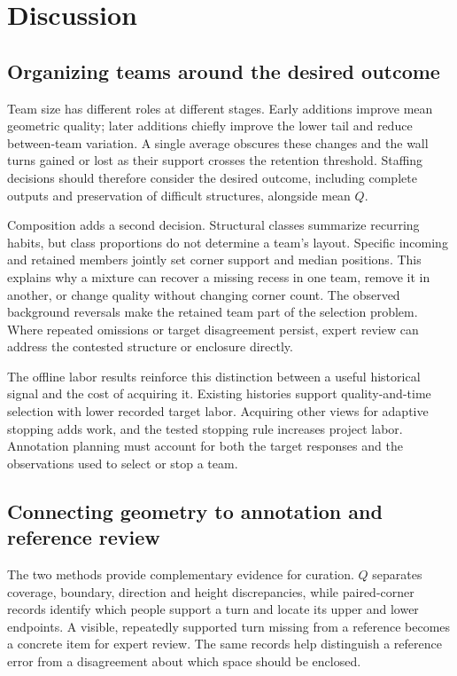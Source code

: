 \section{Discussion}
\label{sec:discussion}

\subsection{Organizing teams around the desired outcome}

Team size has different roles at different stages. Early additions improve mean geometric quality; later additions chiefly improve the lower tail and reduce between-team variation. A single average obscures these changes and the wall turns gained or lost as their support crosses the retention threshold. Staffing decisions should therefore consider the desired outcome, including complete outputs and preservation of difficult structures, alongside mean $Q$.

Composition adds a second decision. Structural classes summarize recurring habits, but class proportions do not determine a team's layout. Specific incoming and retained members jointly set corner support and median positions. This explains why a mixture can recover a missing recess in one team, remove it in another, or change quality without changing corner count. The observed background reversals make the retained team part of the selection problem. Where repeated omissions or target disagreement persist, expert review can address the contested structure or enclosure directly.

The offline labor results reinforce this distinction between a useful historical signal and the cost of acquiring it. Existing histories support quality-and-time selection with lower recorded target labor. Acquiring other views for adaptive stopping adds work, and the tested stopping rule increases project labor. Annotation planning must account for both the target responses and the observations used to select or stop a team.

\subsection{Connecting geometry to annotation and reference review}

The two methods provide complementary evidence for curation. $Q$ separates coverage, boundary, direction and height discrepancies, while paired-corner records identify which people support a turn and locate its upper and lower endpoints. A visible, repeatedly supported turn missing from a reference becomes a concrete item for expert review. The same records help distinguish a reference error from a disagreement about which space should be enclosed.

